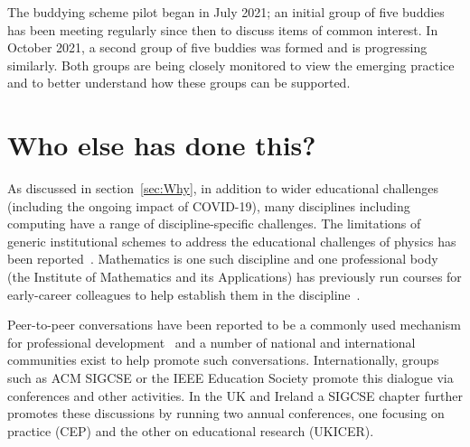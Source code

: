 \documentclass[sigconf]{acmart}
\begin{document}
\begin{comment}
To DO - evaluation of Buddying - PH what is needed here? Is sufficient to indicate the first pilot of 10 buddies has been established? Or do we need feedback from the participants?
\end{comment}

The buddying scheme pilot began in July 2021; an initial group of five
buddies has been meeting regularly since then to discuss items of
common interest. In October 2021, a second group of five buddies was
formed and is progressing similarly. Both groups are being closely
monitored to view the emerging practice and to better understand how
these groups can be supported.


\section{Who else has done this?}
As discussed in section~\ref{sec:Why}, in addition to wider
educational challenges (including the ongoing impact of COVID-19),
many disciplines including computing have a range of
discipline-specific challenges. The limitations of generic
institutional schemes to address the educational challenges of physics
has been reported~\cite{Magueijo2009}. Mathematics is one such
discipline and one professional body (the Institute of Mathematics and its
Applications) has previously run courses for early-career colleagues to help
establish them in the discipline~\cite{IMA}.

Peer-to-peer conversations have been reported to be a commonly used
mechanism for professional development~\cite{King2004} and a number of
national and international communities exist to help promote such
conversations. Internationally, groups such as ACM SIGCSE or the IEEE Education
Society promote this dialogue via conferences and other activities.
In the UK and Ireland a SIGCSE chapter further promotes these
discussions by running two annual conferences, one focusing on
practice (CEP) and the other on educational research (UKICER).

 
\end{document}
